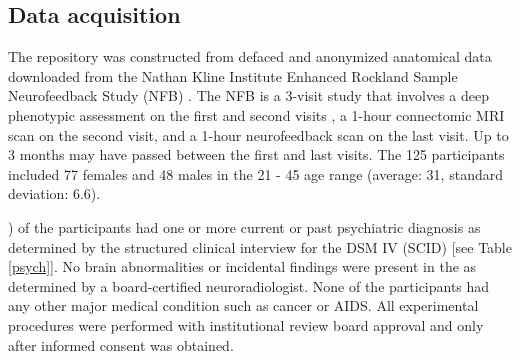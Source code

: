 \subsection*{Data acquisition}

\par The repository was constructed from defaced and anonymized anatomical data downloaded from the Nathan Kline Institute Enhanced Rockland Sample Neurofeedback Study (NFB) \cite{Nooner2012}. The NFB is a 3-visit study that involves a deep phenotypic assessment on the first and second visits\DIFdelbegin %
\DIFdelend , a 1-hour connectomic MRI scan on the second visit, and a 1-hour neurofeedback scan on the last visit. Up to 3 months may have passed between the first and last visits. The 125 participants included 77 females and 48 males in the 21 - 45 age range (average: 31, standard deviation: 6.6). 
\DIFdelbegin {}\DIFdelend \DIFaddbegin 

\cite{Insel2010}\cite{Nooner2012}) of the participants had one or more current or past psychiatric diagnosis as determined by the structured clinical interview for the DSM IV (SCID) \cite{skid} [see Table \ref{psych}]. No brain abnormalities or incidental findings were present in the \DIFdelbegin {}\DIFdelend \DIFaddbegin {}\DIFaddend as determined by a board-certified neuroradiologist. None of the participants had any other major medical condition such as cancer or AIDS. All experimental procedures were performed with institutional review board approval and only after informed consent was obtained.

